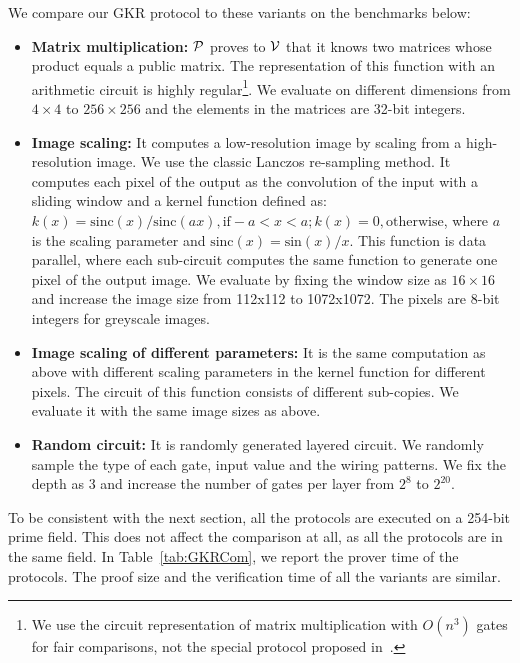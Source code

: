 We compare our GKR protocol to these variants on the benchmarks below:
\begin{itemize}[leftmargin=*]
	\item
	\textbf{Matrix multiplication:} $\P$ proves to $\V$ that it knows two matrices whose product equals a public matrix. The representation of this function with an arithmetic circuit is highly regular\footnote{We use the circuit representation of matrix multiplication with $O(n^3)$ gates for fair comparisons, not the special protocol proposed in~\cite{JT_Thesis}.}. We evaluate on different dimensions from $4\times4$ to $256\times256$ and the elements in the matrices are 32-bit integers. 
	\item
	\textbf{Image scaling:} It computes a low-resolution image by scaling from a high-resolution image. We use the classic Lanczos re-sampling\cite{Lanczos} method. It computes each pixel of the output as the convolution of the input with a sliding window and a kernel function defined as: $k(x)=\text{sinc}(x)/\text{sinc}(ax), \text{if} -a < x < a; k(x) = 0, \text{otherwise}$,
	where $a$ is the scaling parameter and $\text{sinc}(x) = \text{sin}(x)/x$. This function is data parallel, where each sub-circuit computes the same function to generate one pixel of the output image. We evaluate by fixing the window size as $16\times16$ and increase the image size from 112x112 to 1072x1072. The pixels are 8-bit integers for greyscale images.
	\item
	\textbf{Image scaling of different parameters:} It is the same computation as above with different scaling parameters in the kernel function for different pixels.
	The circuit of this function consists of different sub-copies. We evaluate it with the same image sizes as above.
	\item
	\textbf{Random circuit:} It is randomly generated layered circuit. We randomly sample the type of each gate, input value and the wiring patterns. We fix the depth as 3 and increase the number of gates per layer from $2^8$ to $2^{20}$.
\end{itemize}
To be consistent with the next section, all the protocols are executed on a 254-bit prime field. This does not affect the comparison at all, as all the protocols are in the same field. In Table~\ref{tab:GKRCom}, we report the prover time of the protocols. The proof size and the verification time of all the variants are similar.

